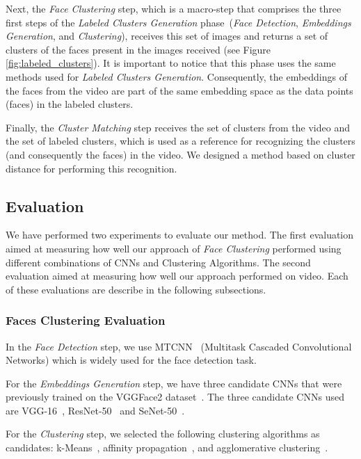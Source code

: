 Next, the \textit{Face Clustering} step, which is a macro-step that comprises the three first steps of the \emph{Labeled Clusters Generation} phase~(\emph{Face Detection}, \emph{Embeddings Generation}, and \emph{Clustering}), receives this set of images and returns a set of clusters of the faces present in the images received  (see Figure \ref{fig:labeled_clusters}).
It is important to notice that this phase uses the same methods used for \emph{Labeled Clusters Generation}.
Consequently, the embeddings of the faces from the video are part of the same embedding space as the data points (faces) in the labeled clusters.

Finally, the \textit{Cluster Matching} step receives the set of clusters from the video and the set of labeled clusters, which is used as a reference for recognizing the clusters (and consequently the faces) in the video.
We designed a method based on cluster distance for performing this recognition.

\subsection{Evaluation}

We have performed two experiments to evaluate our method. 
The first evaluation aimed at measuring how well our approach of \emph{Face Clustering} performed using different combinations of CNNs and Clustering Algorithms. 
The second evaluation aimed at measuring how well our approach performed on video. Each of these evaluations are describe in the following subsections.

\subsubsection{Faces Clustering Evaluation}
\label{faces_clustering_evaluation}
In the \emph{Face Detection} step, we use MTCNN~\cite{mtcnn} (Multitask
Cascaded Convolutional Networks) which is widely used for the face detection task.

For the \emph{Embeddings Generation} step, we have three candidate CNNs that were previously trained on the VGGFace2 dataset~\cite{cao2018vggface2}. The three candidate CNNs used are VGG-16~\cite{vgg16}, ResNet-50~\cite{resnet} and SeNet-50~\cite{senet}. 

For the \emph{Clustering} step, we selected the following clustering algorithms as candidates: k-Means~\cite{lloyd1982least}, affinity propagation~\cite{frey2007clustering}, and agglomerative clustering~\cite{ward1963hierarchical}.

